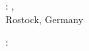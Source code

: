 
\thispagestyle{empty}

\hfill

\vfill

\noindent\myName: \textit{\myTitle}, \ifdef{\mySubtitle}{\mySubtitle,}{} %
\textcopyright\ \myTime      \\      Rostock, Germany

\bigskip
%
\noindent{}: \\ 
\medskip
\myProf \\ 

%
%
\medskip
%
